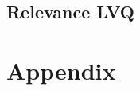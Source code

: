 \documentclass[10pt]{article}
\begin{document}
\subsection{Relevance LVQ}


\section*{Appendix}






\maketitle
\end{document}
